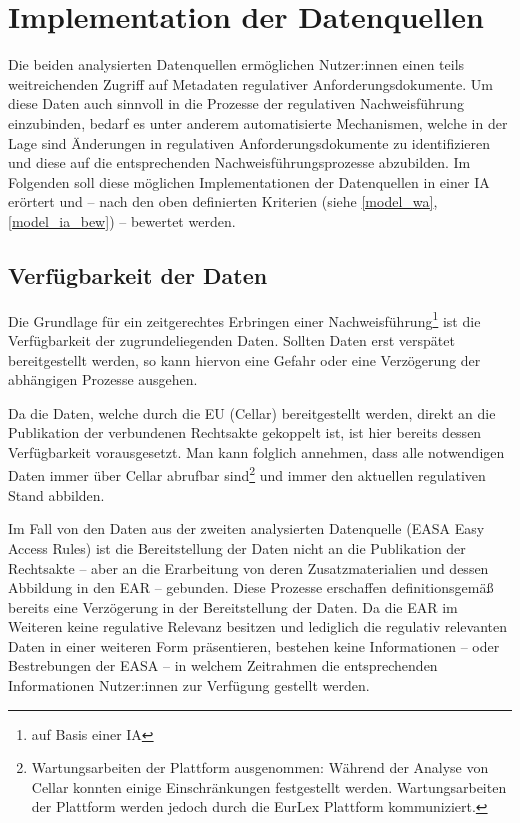 
\chapter{Implementation der Datenquellen} \label{anal}

    Die beiden analysierten Datenquellen ermöglichen Nutzer:innen einen teils weitreichenden Zugriff auf Metadaten regulativer Anforderungsdokumente.
    Um diese Daten auch sinnvoll in die Prozesse der regulativen Nachweisführung einzubinden, bedarf es unter anderem automatisierte Mechanismen, welche in der Lage sind Änderungen in regulativen Anforderungsdokumente zu identifizieren und diese auf die entsprechenden Nachweisführungsprozesse abzubilden.
    Im Folgenden soll diese möglichen Implementationen der Datenquellen in einer \acf{IA} erörtert und -- nach den oben definierten Kriterien (siehe \ref{model_wa}, \ref{model_ia_bew}) -- bewertet werden.

\section{Verfügbarkeit der Daten}

    Die Grundlage für ein zeitgerechtes Erbringen einer Nachweisführung\footnote{auf Basis einer \ac{IA}} ist die Verfügbarkeit der zugrundeliegenden Daten.
    Sollten Daten erst verspätet bereitgestellt werden, so kann hiervon eine Gefahr oder eine Verzögerung der abhängigen Prozesse ausgehen.

    \medskip
    Da die Daten, welche durch die \ac{EU} (Cellar) bereitgestellt werden, direkt an die Publikation der verbundenen Rechtsakte gekoppelt ist, ist hier bereits dessen Verfügbarkeit vorausgesetzt.
    Man kann folglich annehmen, dass alle notwendigen Daten immer über Cellar abrufbar sind\footnote{Wartungsarbeiten der Plattform ausgenommen: Während der Analyse von Cellar konnten einige Einschränkungen festgestellt werden. Wartungsarbeiten der Plattform werden jedoch durch die EurLex Plattform kommuniziert.} und immer den aktuellen regulativen Stand abbilden.

    \medskip
    Im Fall von den Daten aus der zweiten analysierten Datenquelle (\ac{EASA} Easy Access Rules) ist die Bereitstellung der Daten nicht an die Publikation der Rechtsakte -- aber an die Erarbeitung von deren Zusatzmaterialien und dessen Abbildung in den \ac{EAR} -- gebunden.
    Diese Prozesse erschaffen definitionsgemäß bereits eine Verzögerung in der Bereitstellung der Daten.
    Da die \ac{EAR} im Weiteren keine regulative Relevanz besitzen und lediglich die regulativ relevanten Daten in einer weiteren Form präsentieren, bestehen keine Informationen -- oder Bestrebungen der \ac{EASA} \cite{easa_xml_export} -- in welchem Zeitrahmen die entsprechenden Informationen Nutzer:innen zur Verfügung gestellt werden.    

